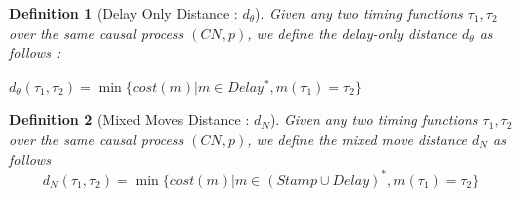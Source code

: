 \documentclass[conference]{IEEEtran}
\newtheorem{definition}{Definition}
\begin{document}
	\begin{definition}[Delay Only Distance : $d_\theta$]
		Given any two timing functions $\tau_1, \tau_2$ over the same causal process $(CN, p)$, we define the delay-only distance $d_\theta$ as follows : 
		
		$d_\theta(\tau_1, \tau_2) = \min \{cost(m) | {m \in Delay^*}, {m(\tau_1) = \tau_2}\}$
	\end{definition}
	
	\begin{definition}[Mixed Moves Distance : $d_N$]
		Given any two timing functions $\tau_1, \tau_2$ over the same causal process $(CN, p)$, we define the mixed move distance $d_N$ as follows 
		\small	$$d_N(\tau_1, \tau_2) = \min \{cost(m) | {m \in (Stamp \cup Delay)^*}, {m(\tau_1) = \tau_2}\}$$
		
	\end{definition} 
	
\end{document}
